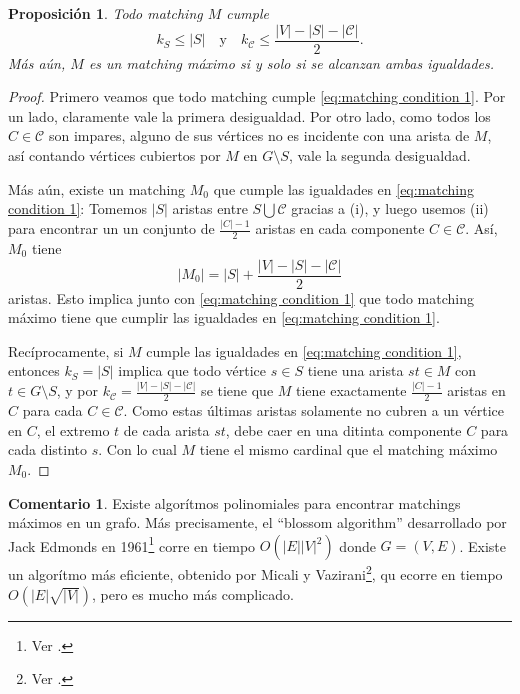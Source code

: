 \documentclass[12pt]{report}
\theoremstyle{plain}
\newtheorem{proposition}[theorem]{Proposición}
\theoremstyle{definition}
\newtheorem{remark}[theorem]{Comentario}
\newcommand{\abs}[1]{\left \vert #1 \right \vert}
\begin{document}
\begin{proposition}
Todo matching $M$ cumple
\begin{equation}\label{eq:matching condition 1}
k_S \leq \abs S \quad \text{y} \quad k_{\mathcal C} \leq \frac{\abs V - \abs S - \abs {\mathcal{C}}}{2}.
\end{equation}
Más aún, $M$ es un matching máximo si y solo si se alcanzan ambas igualdades.
\end{proposition}
\begin{proof}
Primero veamos que todo matching cumple \eqref{eq:matching condition 1}. Por un lado, claramente vale la primera desigualdad. Por otro lado, como todos los $C \in \mathcal{C}$ son impares, alguno de sus vértices no es incidente con una arista de $M$, así contando vértices cubiertos por $M$ en $G\setminus S$, vale la segunda desigualdad.

Más aún, existe un matching $M_0$ que cumple las igualdades en \eqref{eq:matching condition 1}: Tomemos $\abs S$ aristas entre $S \bigcup \mathcal C$ gracias a (i), y luego usemos (ii) para encontrar un un conjunto de $\frac{\abs C-1}{2}$ aristas en cada componente $C \in \mathcal C$. Así, $M_0$ tiene
\[
    \abs{M_0} = \abs S + \frac{\abs V - \abs S - \abs {\mathcal{C}}}{2}
\]
aristas. Esto implica junto con \eqref{eq:matching condition 1} que todo matching máximo tiene que cumplir las igualdades en \eqref{eq:matching condition 1}.

Recíprocamente, si $M$ cumple las igualdades en \eqref{eq:matching condition 1}, entonces $k_S = \abs S$ implica que todo vértice $s \in S$ tiene una arista $st \in M$ con $t \in G \setminus S$, y por $k_\mathcal{C} = \frac{\abs V - \abs S - \abs{\mathcal{C}}}{2}$ se tiene que $M$ tiene exactamente $\frac{\abs C - 1}{2}$ aristas en $C$ para cada $C \in \mathcal{C}$. Como estas últimas aristas solamente no cubren a un vértice en $C$, el extremo $t$ de cada arista $st$, debe caer en una ditinta componente $C$ para cada distinto $s$. Con lo cual $M$ tiene el mismo cardinal que el matching máximo $M_0$.
\end{proof}






\begin{remark}
Existe algorítmos polinomiales para encontrar matchings máximos en un grafo. Más precisamente, el ``blossom algorithm'' desarrollado por Jack Edmonds en 1961\footnote{Ver \cite{edmonds1991glimpseOfHeaven}.} corre en tiempo $O (\abs E \abs V^2)$ donde $G = (V,E)$. Existe un algorítmo más eficiente, obtenido por Micali y Vazirani\footnote{Ver \cite{micaliSilvioVazirani1980MaximumMatching}.}, qu ecorre en tiempo $O(\abs E \sqrt{\abs V})$, pero es mucho más complicado.
\end{remark}
\end{document}
